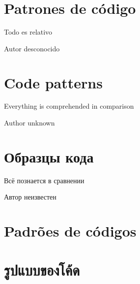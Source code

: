 \ifdefined\SPANISH
\part{Patrones de código}

\epigraph{Todo es relativo}{Autor desconocido}
\fi %

\ifdefined\ENGLISH
\part{Code patterns}

\epigraph{Everything is comprehended in comparison}{Author unknown}
\fi %

\ifdefined\RUSSIAN
\part{Образцы кода}
\epigraph{Всё познается в сравнении}{Автор неизвестен}
\fi %

\ifdefined\BRAZILIAN
\part{Padrões de códigos}
\fi %

\ifdefined\THAI
\part{รูปแบบของโค้ด}
\fi %







